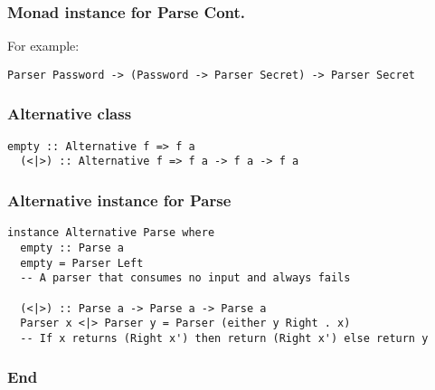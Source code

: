 \documentclass{beamer}
\begin{document}
\begin{frame}
\frametitle{Monad instance for Parse Cont.}

For example:
\begin{lstlisting}[frame=single]
  Parser Password -> (Password -> Parser Secret) -> Parser Secret
\end{lstlisting}

%
%
%
%
\end{frame}


\begin{frame}
\frametitle{Alternative class}
%

\begin{lstlisting}[frame=single]
  empty :: Alternative f => f a
  (<|>) :: Alternative f => f a -> f a -> f a
\end{lstlisting}

\end{frame}


\begin{frame}

\frametitle{Alternative instance for Parse}

\begin{lstlisting}[frame=single]
instance Alternative Parse where
  empty :: Parse a
  empty = Parser Left
  -- A parser that consumes no input and always fails

  (<|>) :: Parse a -> Parse a -> Parse a
  Parser x <|> Parser y = Parser (either y Right . x)
  -- If x returns (Right x') then return (Right x') else return y
\end{lstlisting}

%

%
%

\end{frame}



\begin{frame}
\frametitle{End}
\end{frame}
\end{document}
